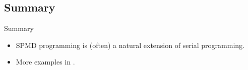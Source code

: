 \subsection{Summary}
\makesubcontentsslidessec


\begin{frame}
  \begin{block}{Summary}
    \begin{itemize}
      \item SPMD programming is (often) a natural extension of serial 
programming.
      \item More  examples in .
    \end{itemize}
  \end{block}
\end{frame}